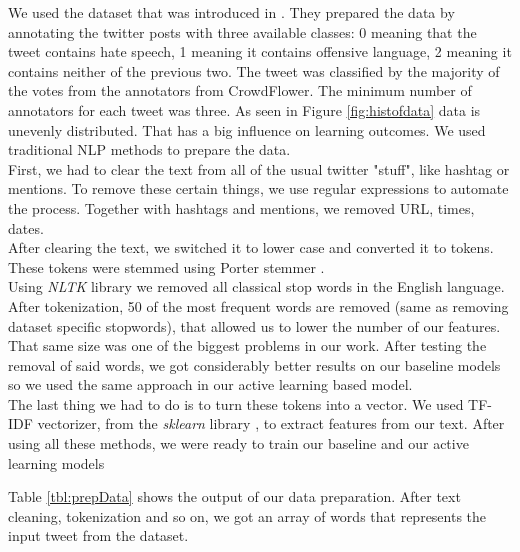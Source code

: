 \documentclass[10pt, a4paper]{article}
\begin{document}
	We used the dataset that was introduced in \citet{Davidson2017AutomatedHS}. They prepared the data by annotating the twitter posts with three available classes: 0 meaning that the tweet contains hate speech, 1 meaning it contains offensive language, 2 meaning it contains neither of the previous two. The tweet was classified by the majority of the votes from the annotators from CrowdFlower. The minimum number of annotators for each tweet was three.
	As seen in Figure \ref{fig:histofdata} data is unevenly distributed. That has a big influence on learning outcomes. We used traditional NLP methods to prepare the data.
	\\First, we had to clear the text from all of the usual twitter "stuff", like hashtag or mentions. To remove these certain things, we use regular expressions to automate the process. Together with hashtags and mentions, we removed URL, times, dates.
	\\After clearing the text, we switched it to lower case and converted it to tokens. These tokens were stemmed using Porter stemmer \citep{PorterStemmer}.
	\\Using \textit{NLTK} library \citep{NLTK} we removed all classical stop words in the English language. After tokenization, 50 of the most frequent words are removed (same as removing dataset specific stopwords), that allowed us to lower the number of our features. That same size was one of the biggest problems in our work.
	After testing the removal of said words, we got considerably better results on our baseline models so we used the same approach in our active learning based model.
	\\The last thing we had to do is to turn these tokens into a vector. We used TF-IDF vectorizer, from the \textit{sklearn} library \citep{scikit-learn}, to extract features from our text. 
	After using all these methods, we were ready to train our baseline and our active learning models
	
	Table \ref{tbl:prepData} shows the output of our data preparation. After text cleaning, tokenization and so on, we got an array of words that represents the input tweet from the dataset.
	
\end{document}
